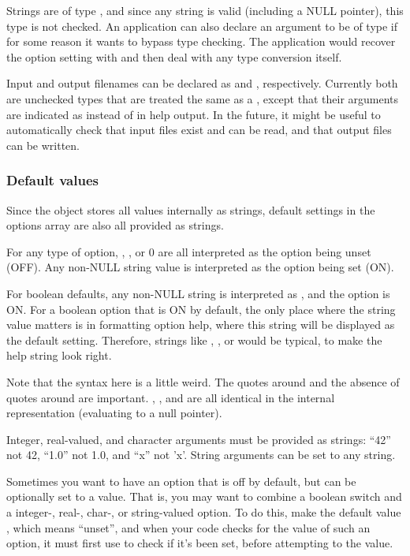 Strings are of type , and since any string is
valid (including a NULL pointer), this type is not checked. An
application can also declare an argument to be of type
 if for some reason it wants to bypass type
checking. The application would recover the option setting with
 and then deal with any type
conversion itself.

Input and output filenames can be declared as 
and , respectively. Currently both are unchecked
types that are treated the same as a , except
that their arguments are indicated as  instead of
 in help output. In the future, it might be useful to
automatically check that input files exist and can be read, and that
output files can be written.

   \subsubsection{Default values}

Since the  object stores all values internally as
strings, default settings in the options array are also all provided
as strings.

For any type of option, , , or 0 are all
interpreted as the option being unset (OFF). Any non-NULL string value
is interpreted as the option being set (ON).

For boolean defaults, any non-NULL string is interpreted as
, and the option is ON.  For a boolean option that is ON
by default, the only place where the string value matters is in
formatting option help, where this string will be displayed as the
default setting. Therefore, strings like ,
, or  would be typical, to make the help
string look right.

Note that the syntax here is a little weird. The quotes around
 and the absence of quotes around  are
important. , , and  are all
identical in the internal representation (evaluating to a null
pointer).

Integer, real-valued, and character arguments must be provided as
strings: ``42'' not 42, ``1.0'' not 1.0, and ``x'' not 'x'.  String
arguments can be set to any string.

Sometimes you want to have an option that is off by default, but can
be optionally set to a value. That is, you may want to combine a
boolean switch and a integer-, real-, char-, or string-valued
option. To do this, make the default value , which means
``unset'', and when your code checks for the value of such an option,
it must first use  to check if it's been set,
before attempting to  the value.

